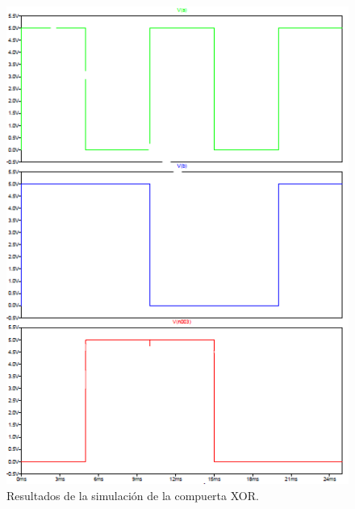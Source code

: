 \documentclass[11pt,graphicx,caption,rotating]{article}
\begin{document}
\begin{figure}[H]
  \centering
    \includegraphics[scale=0.8]{fig3.png}
      \caption{Resultados de la simulación de la compuerta XOR.}
  \label{fig2}
\end{figure}
\noindent
\end{document}
